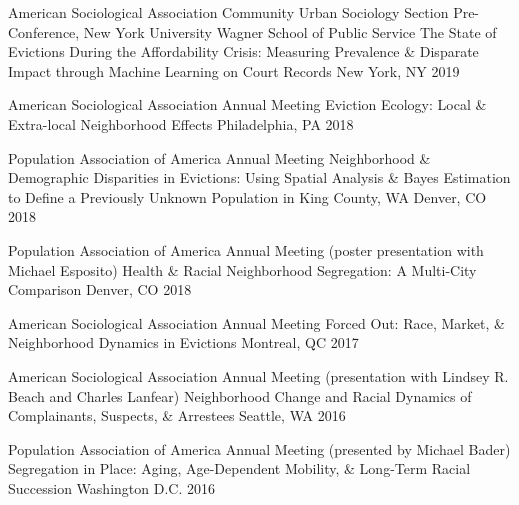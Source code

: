 \begin{cventries}
    
  \cventry
    {American Sociological Association Community Urban Sociology Section Pre-Conference, New York University Wagner School of Public Service} %
    {The State of Evictions During the Affordability Crisis: Measuring Prevalence \& Disparate Impact through Machine Learning on Court Records} %
    {New York, NY} %
    {2019} %
    {}
    
  \cventry
    {American Sociological Association Annual Meeting} %
    {Eviction Ecology: Local \& Extra-local Neighborhood Effects} %
    {Philadelphia, PA} %
    {2018} %
    {}
    
  \cventry
    {Population Association of America Annual Meeting} %
    {Neighborhood \& Demographic Disparities in Evictions: Using Spatial Analysis \& Bayes Estimation to Define a Previously Unknown Population in King County, WA} %
    {Denver, CO} %
    {2018} %
    {}
    
  \cventry
    {Population Association of America Annual Meeting (poster presentation with Michael Esposito)} %
    {Health \& Racial Neighborhood Segregation: A Multi-City Comparison} %
    {Denver, CO} %
    {2018} %
    {}
    
  \cventry
    {American Sociological Association Annual Meeting} %
    {Forced Out: Race, Market, \& Neighborhood Dynamics in Evictions} %
    {Montreal, QC} %
    {2017} %
    {}

  \cventry
    {American Sociological Association Annual Meeting (presentation with Lindsey R. Beach and Charles Lanfear)} %
    {Neighborhood Change and Racial Dynamics of Complainants, Suspects, \& Arrestees} %
    {Seattle, WA} %
    {2016} %
    {}

  \cventry
    {Population Association of America Annual Meeting (presented by Michael Bader)} %
    {Segregation in Place: Aging, Age-Dependent Mobility, \& Long-Term Racial Succession} %
    {Washington D.C.} %
    {2016} %
    {}


\end{cventries}
